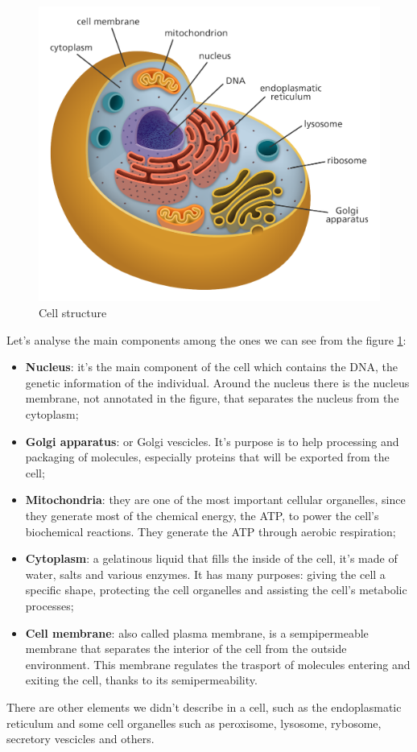 \begin{figure}[h!]
	\includegraphics[scale=.25]{res/proteins_overview/cell_structure.png}
	\centering
	\caption{Cell structure}
	\label{fig:cell-structure}
\end{figure}

Let's analyse the main components among the ones we can see from the figure \ref{fig:cell-structure}:
\begin{itemize}
	\item \textbf{Nucleus}: it's the main component of the cell which contains the DNA, the genetic information of the individual. Around the nucleus there is the nucleus membrane, not annotated in the figure, that separates the nucleus from the cytoplasm;
	\item \textbf{Golgi apparatus}: or Golgi vescicles. It's purpose is to help processing and packaging of molecules, especially proteins that will be exported from the cell;
	\item  \textbf{Mitochondria}: they are one of the most important cellular organelles, since they generate most of the chemical energy, the ATP, to power the cell's biochemical reactions. They generate the ATP through aerobic respiration;
	\item \textbf{Cytoplasm}: a gelatinous liquid that fills the inside of the cell, it's made of water, salts and various enzymes. It has many purposes: giving the cell a specific shape, protecting the cell organelles and assisting the cell's metabolic processes;
	\item \textbf{Cell membrane}: also called plasma membrane, is a sempipermeable membrane that separates the interior of the cell from the outside environment. This membrane regulates the trasport of molecules entering and exiting the cell, thanks to its semipermeability.
\end{itemize}
There are other elements we didn't describe in a cell, such as the endoplasmatic reticulum and some cell organelles such as peroxisome, lysosome, rybosome, secretory vescicles and others.
